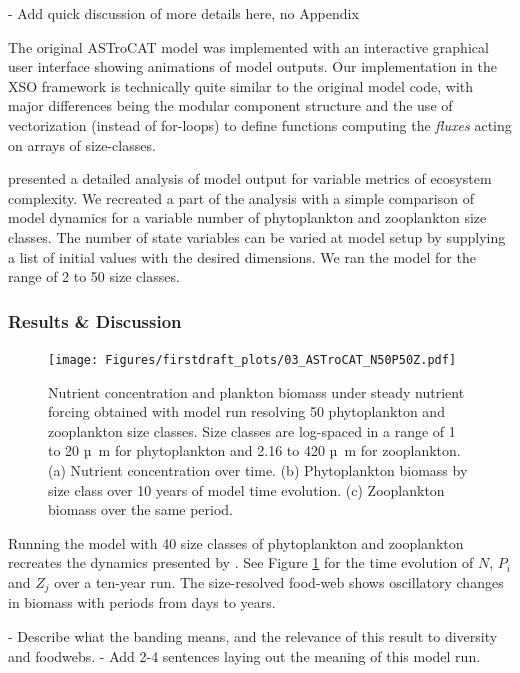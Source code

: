 \documentclass[journal abbreviation, manuscript]{copernicus}
\begin{document}
- Add quick discussion of more details here, no Appendix

The original ASTroCAT model was implemented with an interactive graphical user interface showing animations of model outputs. Our implementation in the XSO framework is technically quite similar to the original model code, with major differences being the modular component structure and the use of vectorization (instead of for-loops) to define functions computing the \textit{fluxes} acting on arrays of size-classes.

\citet{Banas2011b} presented a detailed analysis of model output for variable metrics of ecosystem complexity. We recreated a part of the analysis with a simple comparison of model dynamics for a variable number of phytoplankton and zooplankton size classes. The number of state variables can be varied at model setup by supplying a list of initial values with the desired dimensions. We ran the model for the range of 2 to 50 size classes.

\subsubsection{Results \& Discussion}
\begin{figure}[t]
\texttt{[image: Figures/firstdraft\_plots/03\_ASTroCAT\_N50P50Z.pdf]}
\caption{Nutrient concentration and plankton biomass under steady nutrient forcing obtained with model run resolving 50 phytoplankton and zooplankton size classes. Size classes are log-spaced in a range of 1 to 20 \unit{µ m} for phytoplankton and 2.16 to 420 \unit{µ m} for zooplankton. (a) Nutrient concentration over time. (b) Phytoplankton biomass by size class over 10 years of model time evolution. (c) Zooplankton biomass over the same period.}
\label{Figure:ResultsASTroCAT_1}
\end{figure}

Running the model with 40 size classes of phytoplankton and zooplankton recreates the dynamics presented by \citet{Banas2011b}. See Figure \ref{Figure:ResultsASTroCAT_1} for the time evolution of $N$, $P_i$ and $Z_j$ over a ten-year run. The size-resolved food-web shows oscillatory changes in biomass with periods from days to years. 

- Describe what the banding means, and the relevance of this result to diversity and foodwebs. 
- Add 2-4 sentences laying out the meaning of this model run.
\end{document}
